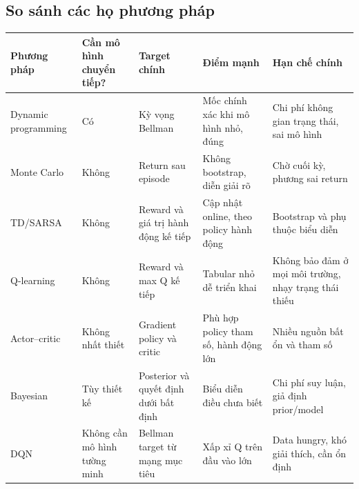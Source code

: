 \subsection{So sánh các họ phương
pháp}\label{so-suxe1nh-cuxe1c-hux1ecd-phux1b0ux1a1ng-phuxe1p}

{\def\LTcaptype{none} %
\begin{longtable}[]{@{}
  >{\raggedright\arraybackslash}p{}
  >{\raggedright\arraybackslash}p{}
  >{\raggedright\arraybackslash}p{}
  >{\raggedright\arraybackslash}p{}
  >{\raggedright\arraybackslash}p{}@{}}
\toprule\noalign{}
\begin{minipage}[b]{\linewidth}\raggedright
Phương pháp
\end{minipage} & \begin{minipage}[b]{\linewidth}\raggedright
Cần mô hình chuyển tiếp?
\end{minipage} & \begin{minipage}[b]{\linewidth}\raggedright
Target chính
\end{minipage} & \begin{minipage}[b]{\linewidth}\raggedright
Điểm mạnh
\end{minipage} & \begin{minipage}[b]{\linewidth}\raggedright
Hạn chế chính
\end{minipage} \\
\midrule\noalign{}
\endhead
\bottomrule\noalign{}
\endlastfoot
Dynamic programming & Có & Kỳ vọng Bellman & Mốc chính xác khi mô hình
nhỏ, đúng & Chi phí không gian trạng thái, sai mô hình \\
Monte Carlo & Không & Return sau episode & Không bootstrap, diễn giải rõ
& Chờ cuối kỳ, phương sai return \\
TD/SARSA & Không & Reward và giá trị hành động kế tiếp & Cập nhật
online, theo policy hành động & Bootstrap và phụ thuộc biểu diễn \\
Q-learning & Không & Reward và max Q kế tiếp & Tabular nhỏ dễ triển khai
& Không bảo đảm ở mọi môi trường, nhạy trạng thái thiếu \\
Actor--critic & Không nhất thiết & Gradient policy và critic & Phù hợp
policy tham số, hành động lớn & Nhiều nguồn bất ổn và tham số \\
Bayesian & Tùy thiết kế & Posterior và quyết định dưới bất định & Biểu
diễn điều chưa biết & Chi phí suy luận, giả định prior/model \\
DQN & Không cần mô hình tường minh & Bellman target từ mạng mục tiêu &
Xấp xỉ Q trên đầu vào lớn & Data hungry, khó giải thích, cần ổn định \\
\end{longtable}
}

